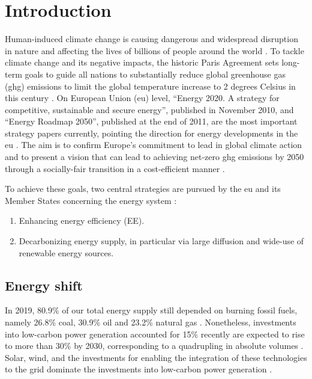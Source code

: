 \chapter{Introduction} 

Human-induced climate change is causing dangerous and widespread disruption in nature and affecting the lives of billions of people around the world \cite{ipcc}. 
To tackle climate change and its negative impacts, the historic Paris Agreement sets long-term goals to guide all nations to substantially reduce global greenhouse gas (\gls{ghg}) emissions to limit the global temperature increase to 2 degrees Celsius in this century \cite{paris}. 
On European Union (\gls{eu}) level, 
“Energy 2020. A strategy for competitive, sustainable and secure energy”, published in November 2010, and “Energy Roadmap 2050”, published at the end of 2011, are the most important strategy papers currently, pointing the direction for energy developments in the \gls{eu} \cite{roadmap}. 
The aim is to confirm Europe's commitment to lead in global climate action and to present a vision that can lead to achieving net-zero \gls{ghg} emissions by 2050 through a socially-fair transition in a cost-efficient manner \cite{clean}. 

To achieve these goals, 
two central strategies are pursued by the \gls{eu} and its Member States concerning the energy system \cite{2050}: 

\begin{enumerate}
  \item Enhancing energy efficiency (EE). 
  \item Decarbonizing energy supply, 
  in particular via large diffusion 
  and wide-use of renewable energy sources.
\end{enumerate}

\section{Energy shift}

In 2019, 80.9\% of our total energy supply still depended on burning fossil fuels, namely 26.8\% coal, 30.9\% oil and 23.2\% natural gas \cite{iea}. 
Nonetheless, investments into low-carbon power generation accounted for 15\% recently are expected to rise to more than 30\% by 2030, corresponding to a quadrupling in absolute volumes \cite{shift}. Solar, wind, and the investments for enabling the integration of these technologies to the grid dominate the investments into low-carbon power generation \cite{shift}. 


